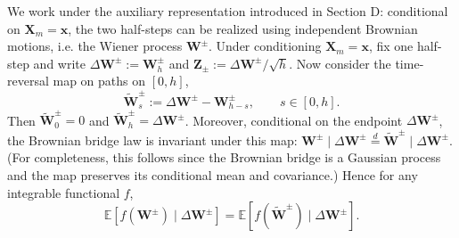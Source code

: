 \documentclass[
 longbibliography,
 twocolumn,
 superscriptaddress,
 amsmath,
 amssymb,
 amsthm,
 amsfonts,
 prl,
 floatfix,
]{revtex4-2}
\begin{document}
\begin{widetext}
We work under the auxiliary representation introduced in Section D: conditional on $\bm{X}_m=\bm x$, the two half-steps can be realized using independent Brownian motions, i.e. the Wiener process $\bm{W}^\pm$. Under conditioning $\bm X_m=\bm x$, fix one half-step and write $\Delta\bm W^\pm:=\bm W^\pm_h$ and $\bm Z_\pm:=\Delta\bm W^\pm/\sqrt h$. Now consider the time-reversal map on paths on $[0,h]$,
\[
\widetilde{\bm W}^\pm_s := \Delta\bm W^\pm - \bm W^\pm_{h-s},\qquad s\in[0,h].
\]
Then $\widetilde{\bm W}^\pm_0=0$ and $\widetilde{\bm W}^\pm_h=\Delta\bm W^\pm$.
Moreover, conditional on the endpoint $\Delta\bm W^\pm$, the Brownian bridge law is invariant under this map:
$\bm W^\pm \mid \Delta\bm W^\pm \stackrel{d}{=} \widetilde{\bm W}^\pm\mid \Delta\bm W^\pm$.
(For completeness, this follows since the Brownian bridge is a Gaussian process and the map preserves its conditional mean and covariance.)
Hence for any integrable functional $f$,
\begin{equation}
\mathbb E\!\left[f(\bm W^\pm)\mid \Delta\bm W^\pm\right]=\mathbb E\!\left[f(\widetilde{\bm W}^\pm)\mid \Delta\bm W^\pm\right].
\label{seq:bridge_invariance}
\end{equation}


\end{widetext}
\end{document}
